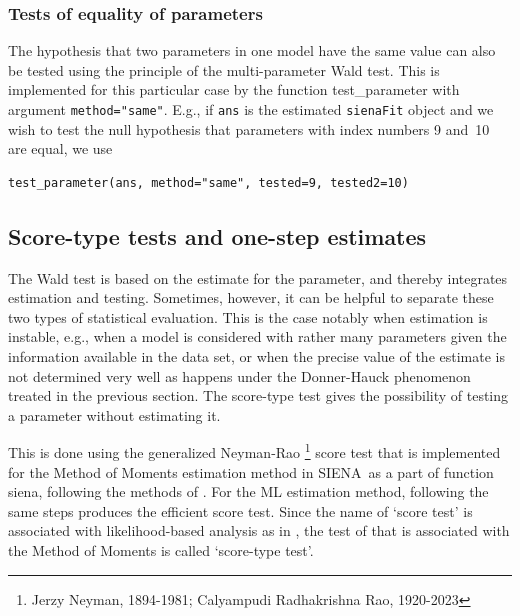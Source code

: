 \documentclass[a4paper,fleqn,11pt]{article}
\newcommand{\+}{\, + \,}
\newcommand{\sfn}[1]{\textsf{#1}}
\newcommand{\si}{{\sf SIENA}}
\begin{document}
\subsubsection{Tests of equality of parameters}

The hypothesis that two parameters in one model have the same value
can also be tested using the principle of the multi-parameter Wald test.
This is implemented for this particular case by the
function \sfn{test\_parameter} with argument \texttt{method="same"}.
E.g., if \texttt{ans} is the estimated \texttt{sienaFit} object and
we wish to test the null hypothesis that parameters with index numbers
9 and~10 are equal, we use
\begin{verbatim}
test_parameter(ans, method="same", tested=9, tested2=10)
\end{verbatim}


\subsection{Score-type tests and one-step estimates}
\label{S_Scoretest}

The Wald test is based on the estimate for the parameter,
and thereby integrates estimation and testing.
Sometimes, however, it can be helpful to separate these two
types of statistical evaluation.
This is the case notably when estimation is instable, e.g.,
when a model is considered with rather many parameters given
the information available in the data set,
or when the precise value of the estimate is not determined
very well as happens under the Donner-Hauck phenomenon
treated in the previous section.
The score-type test gives the possibility of testing
a parameter without estimating it.

This is done using the generalized Neyman-Rao
\footnote{Jerzy Neyman, 1894-1981;
Calyampudi Radhakrishna Rao, 1920-2023} score test
that is implemented for the Method of Moments estimation method
in \si\ as a part of function \textsf{siena}, following the methods
of \citet{Schweinberger12}.
For the ML estimation method,
following the same steps produces the \citet{Rao47} efficient score test.
Since the name of `score test' is associated with
likelihood-based analysis as in \citet{Rao47}, the test
of  \citet{Schweinberger12} that is associated with the Method of Moments
is called `score-type test'.
\end{document}

